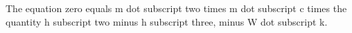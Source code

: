 The equation zero equals m dot subscript two times m dot subscript c times the quantity h subscript two minus h subscript three, minus W dot subscript k.